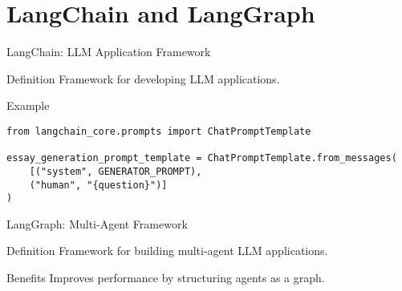 \documentclass[aspectratio=169]{beamer}
\begin{document}
\section{LangChain and LangGraph}

\begin{frame}{LangChain: LLM Application Framework}
  \begin{block}{Definition}
    Framework for developing LLM applications.
  \end{block}

  \begin{block}{Example}
\begin{verbatim}
from langchain_core.prompts import ChatPromptTemplate

essay_generation_prompt_template = ChatPromptTemplate.from_messages(
    [("system", GENERATOR_PROMPT),
    ("human", "{question}")]
)
\end{verbatim}
  \end{block}
\end{frame}

\begin{frame}{LangGraph: Multi-Agent Framework}
  \begin{block}{Definition}
    Framework for building multi-agent LLM applications.
  \end{block}

  \begin{block}{Benefits}
    Improves performance by structuring agents as a graph.
  \end{block}
\end{frame}
\end{document}
